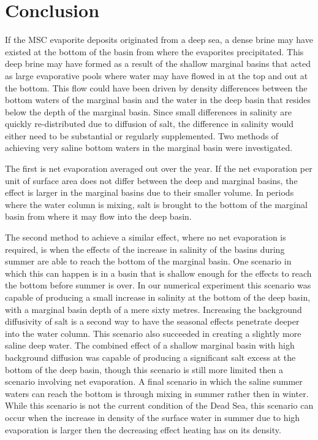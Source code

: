 \documentclass[twocolumn]{article}
\begin{document}
\section{Conclusion}
If the MSC evaporite deposits originated from a deep sea, a dense brine may have existed at the bottom of the basin from where the evaporites precipitated. This deep brine may have formed as a result of the shallow marginal basins that acted as large evaporative pools where water may have flowed in at the top and out at the bottom. This flow could have been driven by density differences between the bottom waters of the marginal basin and the water in the deep basin that resides below the depth of the marginal basin. Since small differences in salinity are quickly re-distributed due to diffusion of salt, the difference in salinity would either need to be substantial or regularly supplemented. Two methods of achieving very saline bottom waters in the marginal basin were investigated. 

The first is net evaporation averaged out over the year. If the net evaporation per unit of surface area does not differ between the deep and marginal basins, the effect is larger in the marginal basins due to their smaller volume. In periods where the water column is mixing, salt is brought to the bottom of the marginal basin from where it may flow into the deep basin. 

The second method to achieve a similar effect, where no net evaporation is required, is when the effects of the increase in salinity of the basins during summer are able to reach the bottom of the marginal basin. One scenario in which this can happen is in a basin that is shallow enough for the effects to reach the bottom before summer is over. In our numerical experiment this scenario was capable of producing a small increase in salinity at the bottom of the deep basin, with a marginal basin depth of a mere sixty metres. Increasing the background diffusivity of salt is a second way to have the seasonal effects penetrate deeper into the water column. This scenario also succeeded in creating a slightly more saline deep water. The combined effect of a shallow marginal basin with high background diffusion was capable of producing a significant salt excess at the bottom of the deep basin, though this scenario is still more limited then a scenario involving net evaporation. 
A final scenario in which the saline summer waters can reach the bottom is through mixing in summer rather then in winter. While this scenario is not the current condition of the Dead Sea, this scenario can occur when the increase in density of the surface water in summer due to high evaporation is larger then the decreasing effect heating has on its density.
\end{document}

